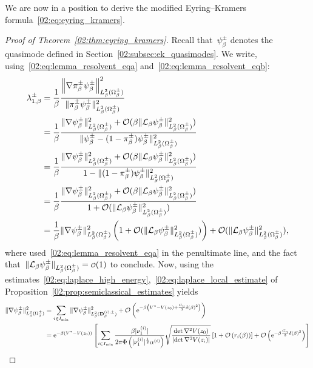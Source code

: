         We are now in a position to derive the modified Eyring--Kramers formula~\eqref{02:eq:eyring_kramers}.
        \begin{proof}[Proof of Theorem~\ref{02:thm:eyring_kramers}]
            Recall that~$\psi_\beta^\pm$ denotes the quasimode defined in Section~\ref{02:subsec:ek_quasimodes}.
            We write, using~\eqref{02:eq:lemma_resolvent_eqa} and~\eqref{02:eq:lemma_resolvent_eqb}:
            \begin{align*}
                \lambda_{1,\beta}^\pm &= \frac1\beta\frac{\left\|\nabla \pi^\pm_\beta\psi_\beta^\pm\right\|^2_{L_\beta^2(\Omega_\beta^\pm)} }{\|\pi^\pm_\beta\psi_\beta^\pm\|^2_{L_\beta^2(\Omega_\beta^\pm)}}\\
                &=\frac1\beta\frac{\|\nabla \psi_\beta^\pm\|^2_{L_\beta^2(\Omega_\beta^\pm)}+\mathcal{O}(\beta\|\mathcal{L}_\beta \psi_\beta^\pm\|^2_{L_\beta^2(\Omega_\beta^\pm)})}{\|\psi_\beta^\pm-(1-\pi_\beta^\pm)\psi_\beta^\pm\|^2_{L_\beta^2(\Omega_\beta^\pm)}}\\
                &=\frac1\beta\frac{\|\nabla \psi_\beta^\pm\|^2_{L_\beta^2(\Omega_\beta^\pm)}+\mathcal{O}(\beta\|\mathcal{L}_\beta \psi_\beta^\pm\|^2_{L_\beta^2(\Omega_\beta^\pm)})}{1-\|(1-\pi_\beta^\pm)\psi_\beta^\pm\|^2_{L_\beta^2(\Omega_\beta^\pm)}}\\
                &=\frac1\beta\frac{\|\nabla \psi_\beta^\pm\|^2_{L_\beta^2(\Omega_\beta^\pm)}+\mathcal{O}(\beta\|\mathcal{L}_\beta \psi_\beta^\pm\|^2_{L_\beta^2(\Omega_\beta^\pm)})}{1+\mathcal{O}(\|\mathcal{L}_\beta \psi_\beta^\pm\|^2_{L_\beta^2(\Omega_\beta^\pm)})}\\
                &=\frac1\beta\|\nabla \psi_\beta^\pm\|^2_{L_\beta^2(\Omega_\beta^\pm)}\left(1+\mathcal{O}(\|\mathcal{L}_\beta \psi_\beta^\pm\|^2_{L_\beta^2(\Omega_\beta^\pm)})\right) + \mathcal{O}(\|\mathcal{L}_\beta \psi_\beta^\pm\|^2_{L_\beta^2(\Omega_\beta^\pm)}),\\
            \end{align*}
            where used~\eqref{02:eq:lemma_resolvent_eqa} in the penultimate line, and the fact that~${\|\cL_\beta \psi_\beta^\pm\|_{\Lmu(\Omega_\beta^\pm)}=\smallo(1)}$ to conclude.
            Now, using the estimates~\eqref{02:eq:laplace_high_energy},~\eqref{02:eq:laplace_local_estimate} of Proposition~\ref{02:prop:semiclassical_estimates} yields
            \[\begin{aligned}\|\nabla \psi_\beta^\pm\|^2_{\Lmu(\Omega_\beta^\pm)} &= \sum_{i\in I_{\min}}\|\nabla \psi_\beta^\pm\|^2_{\Lmu(\Dseti{\pm})}+ \O\left(\e^{-\beta\left(\Vstar - V(z_0) +\frac{C_\eta}3 \largeRadius(\beta)^2\right)}\right)\\
                &=\e^{-\beta(\Vstar-V(z_0))} \left[\sum_{i\in I_{\min}} \frac{\beta|\hessEigval{i}{1}|}{2\pi\Phi\left(|\hessEigval{i}{1}|^{\frac12}\epsLimit{i}\right)}\sqrt{\frac{\det \nabla^2 V(z_0)}{\left|\det \nabla ^2 V(z_i)\right|}} \left[1 +\O\left(r_i(\beta)\right)\right] + \O\left(\e^{-\beta\frac{C_\eta}3 \largeRadius(\beta)^2}\right)\right]\\

\end{aligned}\]
\end{proof}
